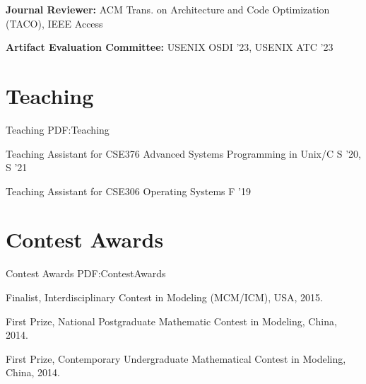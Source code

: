 \documentclass[a4paper,10pt,oneside]{article}
\newcommand{\CVNote}{CV updated on {\DatestampYM{2024}{08}} }
\begin{document}
\begin{body}
\textbf{Journal Reviewer:}
ACM Trans. on Architecture and Code Optimization (TACO), IEEE Access


\textbf{Artifact Evaluation Committee:}
USENIX OSDI '23, USENIX ATC '23


\section
{Teaching}
{Teaching}
{PDF:Teaching}

Teaching Assistant for CSE376 Advanced Systems Programming in Unix/C 
\hfill
S '20, S '21

Teaching Assistant for CSE306 Operating Systems 
\hfill
F '19


\section
{Contest Awards}
{Contest Awards}
{PDF:ContestAwards}

\BulletItem
Finalist, Interdisciplinary Contest in Modeling (MCM/ICM), USA, 2015.

\BulletItem
First Prize, National Postgraduate Mathematic Contest in Modeling, China, 2014.

\BulletItem
First Prize, Contemporary Undergraduate Mathematical Contest in Modeling, China, 2014.










\end{body}


\label{LastPage}~
\end{document}
